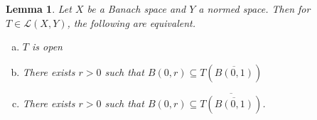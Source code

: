 \documentclass[10pt, oneside, reqno]{amsbook}
\theoremstyle{plain}%
\newtheorem{lem}[thm]{Lemma}
\theoremstyle{definition}
\theoremstyle{remark}
\begin{document}


\begin{lem}
    Let $X$ be a Banach space and $Y$ a normed space.  Then for $T \in \mathcal L(X, Y)$, the following are equivalent.
    \begin{enumerate}[(a)]
        \item $T$ is open
        \item There exists $r > 0$ such that $B(0, r) \subseteq T(\overline{B(0, 1)})$
        \item There exists $r > 0$ such that $B(0, r) \subseteq \overline{T(\overline{B(0, 1)})}$.
    \end{enumerate} 
\end{lem}
\end{document}
